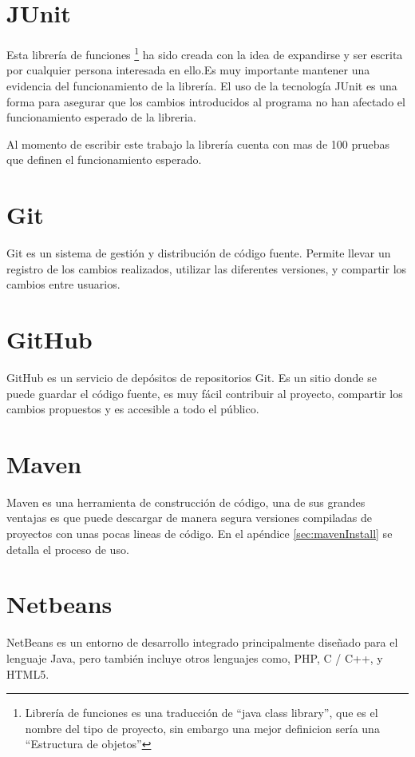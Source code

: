	\section{JUnit}

		Esta librería de funciones \footnote{Librería de funciones es una traducción de ``java class library'', que es el nombre del tipo de proyecto, sin embargo una mejor definicion sería una ``Estructura de objetos''} ha sido creada con la idea de expandirse y ser escrita por cualquier persona interesada en ello.Es muy importante mantener una evidencia del funcionamiento de la librería. El uso de la tecnología JUnit es una forma para asegurar que los cambios introducidos al programa no han afectado el funcionamiento esperado de la libreria.

		Al momento de escribir este trabajo la librería cuenta con mas de 100 pruebas que definen el funcionamiento esperado.

	\section{Git}

		Git es un sistema de gestión y distribución de código fuente. Permite llevar un registro de los cambios realizados, utilizar las diferentes versiones, y compartir los cambios entre usuarios.

	\section{GitHub}

		GitHub es un servicio de depósitos de repositorios Git. Es un sitio donde se puede guardar el código fuente, es muy fácil contribuir al proyecto, compartir los cambios propuestos y es accesible a todo el público.

	\section{Maven}

		Maven es una herramienta de construcción de código, una de sus grandes ventajas es que puede descargar de manera segura versiones compiladas de proyectos con unas pocas lineas de código. En el apéndice \ref{sec:mavenInstall}  se detalla el proceso de uso.

	\section{Netbeans}
		NetBeans es un entorno de desarrollo integrado principalmente diseñado para el lenguaje Java, pero también incluye otros lenguajes como, PHP, C / C++, y HTML5. 

